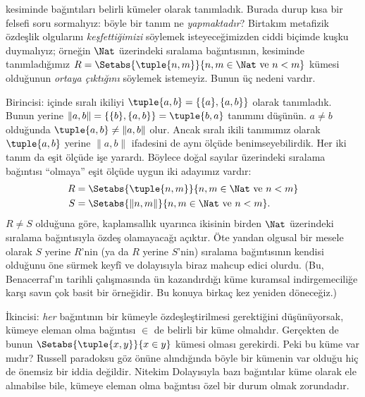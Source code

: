 


 kesiminde bağıntıları belirli kümeler olarak tanımladık. Burada
durup kısa bir felsefi soru sormalıyız: böyle bir tanım ne \emph{yapmaktadır}?
Birtakım metafizik özdeşlik olgularını \emph{keşfettiğimizi} söylemek
isteyeceğimizden ciddi biçimde kuşku duymalıyız; örneğin $\Nat$ üzerindeki sıralama
bağıntısının,  kesiminde tanımladığımız
$R=\Setabs{\tuple{n,m}}{n, m \in \Nat\text{ ve } n < m}$ kümesi olduğunun
\emph{ortaya çıktığını} söylemek istemeyiz. Bunun üç nedeni vardır.

Birincisi:  içinde sıralı ikiliyi
$\tuple{a, b}=\{\{a\}, \{a, b\}\}$ olarak tanımladık. Bunun yerine
$\lVert a,b\rVert = \{\{b\}, \{a, b\}\}=\tuple{b,a}$ tanımını düşünün.
$a \neq b$ olduğunda $\tuple{a, b} \neq \lVert a,b\rVert$ olur. Ancak sıralı
ikili tanımımız olarak $\tuple{a,b}$ yerine $\lVert a,b\rVert$ ifadesini de
aynı ölçüde benimseyebilirdik. Her iki tanım da eşit ölçüde işe yarardı. Böylece
doğal sayılar üzerindeki sıralama bağıntısı ``olmaya'' eşit ölçüde uygun iki
adayımız vardır:
\begin{align*}
		R &= \Setabs{\tuple{n,m}}{n, m \in \Nat \text{ ve }n < m}\\
		S &= \Setabs{\lVert n,m\rVert}{n, m \in \Nat \text{ ve }n < m}.
\end{align*}
$R \neq S$ olduğuna göre, kaplamsallık uyarınca ikisinin birden $\Nat$ üzerindeki
sıralama bağıntısıyla özdeş olamayacağı açıktır. Öte yandan olgusal bir mesele
olarak $S$ yerine $R$'nin (ya da $R$ yerine $S$'nin) sıralama bağıntısının kendisi olduğunu
öne sürmek keyfî ve dolayısıyla biraz mahcup edici olurdu. (Bu, Benacerraf'ın
\citeyear{Benacerraf1965} tarihli çalışmasında ün kazandırdığı küme kuramsal
indirgemeciliğe karşı savın çok basit bir örneğidir. Bu konuya birkaç kez
yeniden döneceğiz.)

İkincisi: \emph{her} bağıntının bir kümeyle özdeşleştirilmesi gerektiğini
düşünüyorsak, kümeye eleman olma bağıntısı $\in$ de belirli bir küme olmalıdır.
Gerçekten de bunun $\Setabs{\tuple{x,y}}{x \in y}$ kümesi olması gerekirdi.
Peki bu küme var mıdır? Russell paradoksu göz önüne alındığında böyle bir
kümenin var olduğu hiç de önemsiz bir iddia değildir. Nitekim
 Dolayısıyla bazı bağıntılar küme olarak ele
alınabilse bile, kümeye eleman olma bağıntısı özel bir durum olmak zorundadır.

